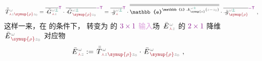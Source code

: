 \begin{align} \label{eq:transition_matrix-transverse_input}
	\xint{\mathcolor{gray}{-}}{32}{\bar{\bar{T}}}^{\;\!\mathcolor{gray}{\omega}}_{\;\! \textcolor{Maroon}{\Yup} \mathcolor{gray}{z} \textcolor{Maroon}{\symup{\rho}} \mathcolor{gray}{z_0}} = \overline{\xint{\mathcolor{gray}{-}}{20}{\bar{G}}^{\;\!\mathcolor{gray}{\omega} \textcolor{PineGreen}{\pm}}_{\;\! \textcolor{Maroon}{\Yup} \mathcolor{gray}{z}}}^{\mathsf{\textcolor{Plum}{T}}} \cdot \overline{\xint{\mathcolor{gray}{-}}{20}{\bar{G}}^{\;\!\mathcolor{gray}{\omega} \textcolor{PineGreen}{\pm}}_{\;\! \textcolor{Maroon}{\symup{\rho}} \mathcolor{gray}{z_0}}}^{\textcolor{Plum}{-\mathsf{T}}} = \overline{\xint{{}^{}_{\mathcolor{gray}{-}}}{10}{\bar{g}}^{\;\!\mathcolor{gray}{\omega} \textcolor{PineGreen}{\pm}}_{\;\! \textcolor{Maroon}{\Yup}}}^{\mathsf{\textcolor{Plum}{T}}} \cdot \overline{\overline{\mathbb{e}^{\mathbb{i} \xint{\begin{smallmatrix} ~ \\ {}^{}_{\mathcolor{gray}{-}} \\ ~ \end{smallmatrix}}{15}{k}_{\symup{z}}^{\;\! \mathcolor{gray}{\omega} \textcolor{PineGreen}{\pm}} \left( \mathcolor{gray}{z} - \mathcolor{gray}{z_0} \right)}}} \cdot \overline{\xint{{}^{}_{\mathcolor{gray}{-}}}{10}{\bar{g}}^{\;\!\mathcolor{gray}{\omega} \textcolor{PineGreen}{\pm}}_{\;\! \textcolor{Maroon}{\symup{\rho}}}}^{\textcolor{Plum}{-\mathsf{T}}} ~,
\end{align}
这样一来，在  的条件下， 转变为  的 $\textcolor{Plum}{3 \times 1}$ \textcolor{Plum}{输入}场 $\xint{\mathcolor{gray}{-}}{25}{\bar{E}}^{\;\!\mathcolor{gray}{\omega}}_{\;\! \textcolor{Maroon}{\Yup} \mathcolor{gray}{z}}$ 的 $\textcolor{Plum}{2 \times 1}$ 降维 $\xint{\mathcolor{gray}{-}}{25}{\bar{E}}^{\;\!\mathcolor{gray}{\omega}}_{\;\! \textcolor{Maroon}{\symup{\rho}} \mathcolor{gray}{z_0}}$ 对应物
\begin{align} \label{eq:E=transition_matrix-Erho}
	\xint{\mathcolor{gray}{-}}{30}{\bar{E}}^{\;\!\mathcolor{gray}{\omega}}_{\;\! \textcolor{Maroon}{\Yup} \mathcolor{gray}{z}} &:= \xint{\mathcolor{gray}{-}}{32}{\bar{\bar{T}}}^{\;\!\mathcolor{gray}{\omega}}_{\;\! \textcolor{Maroon}{\Yup} \mathcolor{gray}{z} \textcolor{Maroon}{\symup{\rho}} \mathcolor{gray}{z_0}} \cdot \xint{\mathcolor{gray}{-}}{30}{\bar{E}}^{\;\!\mathcolor{gray}{\omega}}_{\;\! \textcolor{Maroon}{\symup{\rho}} \mathcolor{gray}{z_0}} ~,
\end{align}
